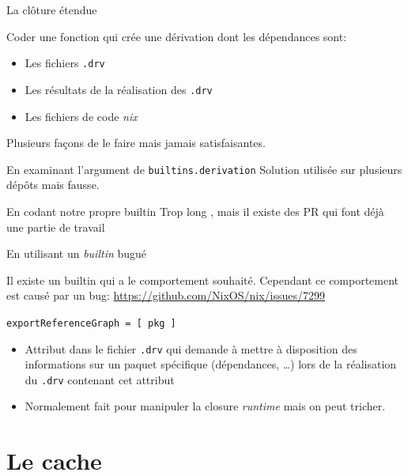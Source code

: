\documentclass{beamer}
\begin{document}
\begin{frame}{La clôture étendue}

	Coder une fonction qui crée une dérivation dont les dépendances sont:
	\begin{itemize}
		\item Les fichiers \texttt{.drv}
		\item Les résultats de la réalisation des \texttt{.drv}
		\item Les fichiers de code \emph{nix}
	\end{itemize}

	\vspace{0.3cm}
	Plusieurs façons de le faire mais jamais satisfaisantes.
\end{frame}

\begin{frame}{En examinant l'argument de \texttt{builtins.derivation}}
	Solution utilisée sur plusieurs dépôts mais fausse.
\end{frame}

\begin{frame}{En codant notre propre builtin}
	Trop long \tiny{, mais il existe des PR qui font déjà une partie de travail}
\end{frame}

\begin{frame}{En utilisant un \emph{builtin} bugué}

	Il existe un builtin qui a le comportement souhaité. Cependant ce comportement est causé par un bug: \url{https://github.com/NixOS/nix/issues/7299}

	\begin{center}
		\texttt{exportReferenceGraph = [ pkg ]}
	\end{center}

	\begin{itemize}
		\item Attribut dans le fichier \texttt{.drv} qui demande à mettre à disposition des informations sur un paquet spécifique (dépendances, \dots) lors de la réalisation du \texttt{.drv} contenant cet attribut
		\item Normalement fait pour manipuler la closure \emph{runtime} mais on peut tricher.
	\end{itemize}
\end{frame}


\section{Le cache}
\end{document}
